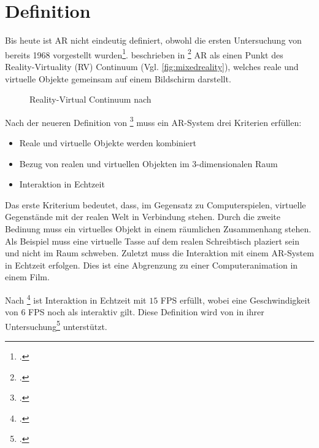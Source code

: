 \section{Definition} %
\label{sec:definition}
\begin{comment}
	Definiere Begriffe der Augmented Reality und Bildverarbeitung, die dem Leser nicht geläufig sind. Denke dabei an Prof. Klocke als Leser ohne besonderen Kenntnisstand in der AR/Bildverarbeitung.

	Azuma Definition der AR
	Milgram + Kishino MR oder nur Milgram Definition MR
\end{comment}

Bis heute ist \gls{AR} nicht eindeutig definiert, obwohl die ersten Untersuchung von \citeauthor{sutherland} bereits
 1968 vorgestellt wurden\footcite{sutherland}. \citeauthor{milgram94b} beschrieben in
 \footcite{milgram94b} \gls{AR} als einen Punkt des Reality-Virtuality (RV) Continuum
 (Vgl. \autoref{fig:mixedreality}), welches reale und virtuelle Objekte gemeinsam auf einem Bildschirm darstellt.
\begin{figure}[!ht]
	\centering
	
	\caption{Reality-Virtual Continuum nach \citeauthor{milgram94b}}
	\label{fig:mixedreality}
\end{figure}

Nach der neueren Definition von \citeauthor{azuma97}\footcite{azuma97} muss ein \gls{AR}-System drei Kriterien
 erfüllen:
\begin{itemize}
	\item Reale und virtuelle Objekte werden kombiniert
	\item Bezug von realen und virtuellen Objekten im 3-dimensionalen Raum
	\item Interaktion in Echtzeit
\end{itemize}
Das erste Kriterium bedeutet, dass, im Gegensatz zu Computerspielen, virtuelle Gegenstände mit der realen Welt in
 Verbindung stehen. Durch die zweite Bedinung muss ein virtuelles Objekt in einem räumlichen Zusammenhang stehen. Als
 Beispiel muss eine virtuelle Tasse auf dem realen Schreibtisch plaziert sein und nicht im Raum schweben. Zuletzt muss
 die Interaktion mit einem \gls{AR}-System in Echtzeit erfolgen. Dies ist eine Abgrenzung zu einer Computeranimation in
 einem Film.

Nach \citeauthor{moeller2008}\footcite[Vgl.][S.~1]{moeller2008} ist Interaktion in Echtzeit mit $15$ FPS erfüllt, wobei
 eine Geschwindigkeit von $6$ FPS noch als interaktiv gilt. Diese Definition wird von \citeauthor{wagner09b} in ihrer
 Untersuchung\footcite[Vgl.][S.~8--9]{wagner09b} unterstützt.

